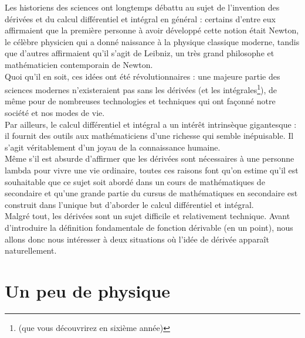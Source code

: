 \documentclass[a4paper,fontsize=13pt]{scrreprt}
\theoremstyle{plain}
\theoremstyle{definition}
\begin{document}
Les historiens des sciences ont longtemps débattu au sujet de \og l'invention \fg{} des dérivées et du calcul différentiel et intégral en général : certains d'entre eux affirmaient que la première personne à avoir développé cette notion était Newton, le célèbre physicien qui a donné naissance à la physique classique moderne, tandis que d'autres affirmaient qu'il s'agit de Leibniz, un très grand philosophe et mathématicien contemporain de Newton. \\
Quoi qu'il en soit, ces idées ont été révolutionnaires : une majeure partie des sciences modernes n'existeraient pas sans les dérivées (et les intégrales\footnote{(que vous découvrirez en sixième année)}), de même pour de nombreuses technologies et techniques qui ont façonné notre société et nos modes de vie. \\
Par ailleurs, le calcul différentiel et intégral a un intérêt intrinsèque gigantesque : il fournit des outils aux mathématiciens d'une richesse qui semble inépuisable. Il s'agit véritablement d'un joyau de la connaissance humaine. \\
Même s'il est absurde d'affirmer que les dérivées sont nécessaires à une personne lambda pour vivre une vie ordinaire, toutes ces raisons font qu'on estime qu'il est souhaitable que ce sujet soit abordé dans un cours de mathématiques de secondaire et qu'une grande partie du cursus de mathématiques en secondaire est construit dans l'unique but d'aborder le calcul différentiel et intégral. \\
Malgré tout, les dérivées sont un sujet difficile et relativement technique. Avant d'introduire la définition fondamentale de fonction dérivable (en un point), nous allons donc nous intéresser à deux situations où l'idée de dérivée apparaît naturellement.

\section{Un peu de physique}
\end{document}
